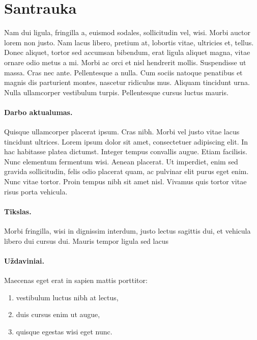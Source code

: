 \documentclass[a4paper, 12pt]{article}
\begin{document}
\tableofcontents
\newpage


\section*{Santrauka}
{}
%
Nam dui ligula, fringilla a, euismod sodales, sollicitudin vel, wisi. Morbi 
auctor lorem non justo. Nam lacus libero, pretium at, lobortis vitae, 
ultricies et, tellus. Donec aliquet, tortor sed accumsan bibendum, erat 
ligula aliquet magna, vitae ornare odio metus a mi. Morbi ac orci et nisl 
hendrerit mollis. Suspendisse ut massa. Cras nec ante. Pellentesque a nulla. 
Cum sociis natoque penatibus et magnis dis parturient montes, nascetur 
ridiculus mus. Aliquam tincidunt urna. Nulla ullamcorper vestibulum turpis. 
Pellentesque cursus luctus mauris.
%
\paragraph{Darbo aktualumas.} Quisque ullamcorper placerat ipsum. Cras nibh. 
Morbi vel justo vitae lacus tincidunt ultrices. Lorem ipsum dolor sit amet, 
consectetuer adipiscing elit. In hac habitasse platea dictumst. Integer tempus 
convallis augue. Etiam facilisis. Nunc elementum fermentum wisi. Aenean 
placerat. Ut imperdiet, enim sed gravida sollicitudin, felis odio placerat 
quam, ac pulvinar elit purus eget enim. Nunc vitae tortor. Proin tempus nibh 
sit amet nisl. Vivamus quis tortor vitae risus porta vehicula.
%
\paragraph{Tikslas.} Morbi fringilla, wisi in dignissim interdum, justo 
lectus sagittis dui, et vehicula libero dui cursus dui. Mauris tempor ligula 
sed lacus
%
\paragraph{Uždaviniai.} Maecenas eget erat in sapien mattis porttitor:
%
\begin{enumerate}
  \addtolength{\itemsep}{-0.5\baselineskip} 
  \item vestibulum luctus nibh at lectus,
  \item duis cursus enim ut augue,
  \item quisque egestas wisi eget nunc.
\end{enumerate}
\end{document}
